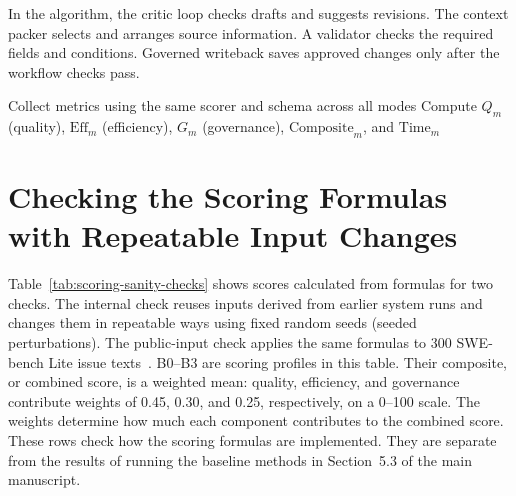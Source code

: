 \documentclass[10pt,a4paper]{article}
\renewcommand{\thetable}{S\arabic{table}}
\begin{document}
In the algorithm, the critic loop checks drafts and suggests revisions. The context packer selects and arranges source information. A validator checks the required fields and conditions. Governed writeback saves approved changes only after the workflow checks pass.

\begin{algorithm*}[H]
\DontPrintSemicolon
\footnotesize
\caption{Ablation-Mode Execution for B0/B1/B2/B3 Comparison}
\label{alg:ablation-exec}
Collect metrics using the same scorer and schema across all modes\;
Compute $Q_m$ (quality), $\mathrm{Eff}_m$ (efficiency), $G_m$ (governance), $\mathrm{Composite}_m$, and $\mathrm{Time}_m$\;
\;
\end{algorithm*}


\FloatBarrier

\clearpage
\appendix
\setcounter{table}{5}
\renewcommand{\thetable}{\thesection.\arabic{table}}
\section{Checking the Scoring Formulas with Repeatable Input Changes}\label{sec:stress-testing}
Table~\ref{tab:scoring-sanity-checks} shows scores calculated from formulas for two checks. The internal check reuses inputs derived from earlier system runs and changes them in repeatable ways using fixed random seeds (seeded perturbations). The public-input check applies the same formulas to 300 SWE-bench Lite issue texts~\citep{R26}. B0--B3 are scoring profiles in this table. Their composite, or combined score, is a weighted mean: quality, efficiency, and governance contribute weights of 0.45, 0.30, and 0.25, respectively, on a 0--100 scale. The weights determine how much each component contributes to the combined score. These rows check how the scoring formulas are implemented. They are separate from the results of running the baseline methods in Section~5.3 of the main manuscript.
\end{document}
